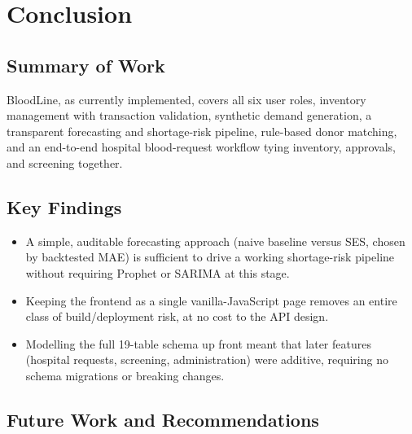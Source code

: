 \documentclass[12pt,twoside]{report}
\begin{document}
\chapter{Conclusion}

\section{Summary of Work}

BloodLine, as currently implemented, covers all six user roles, inventory management with transaction validation, synthetic demand generation, a transparent forecasting and shortage-risk pipeline, rule-based donor matching, and an end-to-end hospital blood-request workflow tying inventory, approvals, and screening together.

\section{Key Findings}

\begin{itemize}
\item A simple, auditable forecasting approach (naive baseline versus SES, chosen by backtested MAE) is sufficient to drive a working shortage-risk pipeline without requiring Prophet or SARIMA at this stage.
\item Keeping the frontend as a single vanilla-JavaScript page removes an entire class of build/deployment risk, at no cost to the API design.
\item Modelling the full 19-table schema up front meant that later features (hospital requests, screening, administration) were additive, requiring no schema migrations or breaking changes.
\end{itemize}

\section{Future Work and Recommendations}
\end{document}
